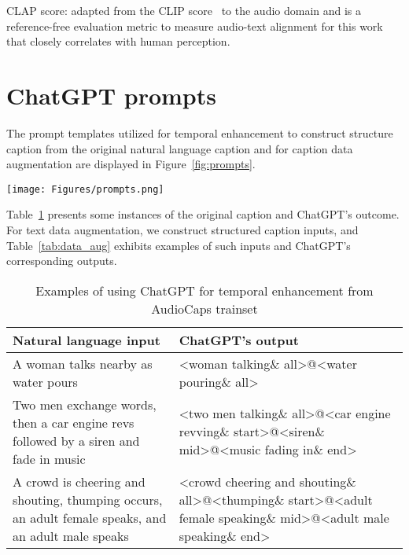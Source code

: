 \documentclass{article}
\begin{document}
CLAP score: adapted from the CLIP score~\cite{hessel2021clipscore,radford2021learning} to the audio domain and is a reference-free evaluation metric to measure audio-text alignment for this work that closely correlates with human perception.


\section{ChatGPT prompts}  \label{app:gpt_prompt}
The prompt templates utilized for temporal enhancement to construct structure caption from the original natural language caption  and for caption data augmentation are displayed in Figure~\ref{fig:prompts}. 


\begin{figure*}[!t]
    \centering 
    \texttt{[image: Figures/prompts.png]}
    \caption{The prompt templates we used for temporal enhancement and data augmentation. We use the symbol '\&' to split the sound event and the time order. We use the symbol '@' to split <event \& order> pairs.} 
    \label{fig:prompts}
\end{figure*}

Table~\ref{tab:extract_example} presents some instances of the original caption and ChatGPT's outcome. For text data augmentation, we construct structured caption inputs, and Table~\ref{tab:data_aug} exhibits examples of such inputs and ChatGPT's corresponding outputs.


\begin{table}[htbp]
  \centering
    \begin{tabular}{p{14.835em}|p{22.335em}}
    \hline
    Natural language input & ChatGPT's output \\
    \hline
    A woman talks nearby as water pours & <woman talking\& all>@<water pouring\& all> \\
    \hline
    Two men exchange words, then a car engine revs followed by a siren and fade in music & <two men talking\& all>@<car engine revving\& start>@<siren\& mid>@<music fading in\& end> \\
    \hline
    A crowd is cheering and shouting, thumping occurs, an adult female speaks, and an adult male speaks & <crowd cheering and shouting\& all>@<thumping\& start>@<adult female speaking\& mid>@<adult male speaking\& end> \\
    \hline
    \end{tabular}\vspace{5pt}
  \caption{Examples of using ChatGPT for temporal enhancement from AudioCaps trainset}
  \label{tab:extract_example}\end{table}
\end{document}
